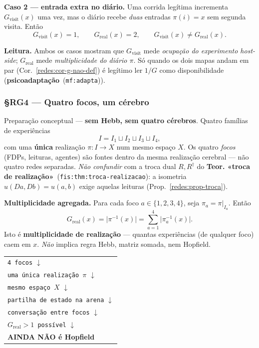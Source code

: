 \documentclass[11pt,a4paper]{article}
\newcommand{\code}[1]{\texttt{\small #1}}
\newcommand{\abs}[1]{\lvert #1\rvert}
\newcommand{\fis}[2]{\textbf{#2}~\textnormal{(\code{#1})}}
\newcommand{\mf}[2]{\textbf{#2}~\textnormal{(\code{mf:#1})}}
\begin{document}
\medskip\noindent\textbf{Caso 2 --- entrada extra no diário.} Uma corrida legítima
incrementa $G_{\mathrm{visit}}(x)$ uma vez, mas o diário recebe \emph{duas}
entradas $\pi(i)=x$ sem segunda visita. Então
\[
G_{\mathrm{visit}}(x)=1,\qquad G_{\mathrm{real}}(x)=2,\qquad
G_{\mathrm{visit}}(x)\neq G_{\mathrm{real}}(x).
\]

\medskip\noindent\textbf{Leitura.} Ambos os casos mostram que $G_{\mathrm{visit}}$ mede
\emph{ocupação do experimento host-side}; $G_{\mathrm{real}}$ mede
\emph{multiplicidade do diário $\pi$}. Só quando os dois mapas andam em par
(Cor.~\ref{redes:cor-g-nao-def}) é legítimo ler $1/G$ como disponibilidade
(\mf{adapta}{psicoadaptação}).

\subsubsection{§RG4 --- Quatro focos, um cérebro}\label{redes:rg4}

\noindent Preparação conceptual --- \textbf{sem Hebb, sem quatro cérebros}. Quatro
famílias de experiências
\[
I=I_1\sqcup I_2\sqcup I_3\sqcup I_4,
\]
com uma \textbf{única} realização $\pi\colon I\to X$ num mesmo espaço $X$. Os quatro
\emph{focos} (FDPs, leituras, agentes) são fontes dentro da mesma realização
cerebral --- não quatro redes separadas. \emph{Não confundir} com a troca dual
$R,R^{\dagger}$ do \fis{fis:thm:troca-realizacao}{Teor. «troca de realização»}:
a isometria $u(Da,Db)=u(a,b)$ exige aquelas leituras (Prop.~\ref{redes:prop-troca}).

\medskip\noindent\textbf{Multiplicidade agregada.} Para cada foco $a\in\{1,2,3,4\}$,
seja $\pi_a=\pi|_{I_a}$. Então
\[
G_{\mathrm{real}}(x)=\abs{\pi^{-1}(x)}
=\sum_{a=1}^{4}\abs{\pi_a^{-1}(x)}.
\]
Isto é \textbf{multiplicidade de realização} --- quantas experiências (de qualquer
foco) caem em $x$. \emph{Não} implica regra Hebb, matriz somada, nem Hopfield.

\begin{center}\small
\begin{tabular}{@{}l@{}}
\toprule
\code{4 focos} $\downarrow$ \\
\code{uma única realização $\pi$} $\downarrow$ \\
\code{mesmo espaço $X$} $\downarrow$ \\
\code{partilha de estado na arena} $\downarrow$ \\
\code{conversação entre focos} $\downarrow$ \\
\code{$G_{\mathrm{real}}>1$ possível} $\downarrow$ \\
\textbf{AINDA NÃO é Hopfield} \\
\bottomrule
\end{tabular}
\end{center}
\end{document}
